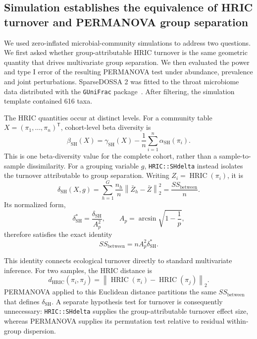 \subsection{Simulation establishes the equivalence of HRIC turnover and PERMANOVA group separation}

We used zero-inflated microbial-community simulations to address two questions.
We first asked whether group-attributable HRIC turnover is the same geometric
quantity that drives multivariate group separation. We then evaluated the
power and type I error of the resulting PERMANOVA test under abundance,
prevalence and joint perturbations. SparseDOSSA 2 was fitted to the throat
microbiome data distributed with the \texttt{GUniFrac}
package~\cite{charlson2010disordered,chen2012associating,
ma2021sparsedossa}. After filtering, the simulation template contained 616
taxa.

The HRIC quantities occur at distinct levels. For a community table
\(X=(\pi_1,\ldots,\pi_n)^\mathsf{T}\), cohort-level beta diversity is
\[
\beta_{\mathrm{SH}}(X)
  = \gamma_{\mathrm{SH}}(X)
  - \frac{1}{n}\sum_{i=1}^{n}\alpha_{\mathrm{SH}}(\pi_i).
\]
This is one beta-diversity value for the complete cohort, rather than a
sample-to-sample dissimilarity. For a grouping variable \(g\),
\texttt{HRIC::SHdelta} instead isolates the turnover attributable to group
separation. Writing \(Z_i=\operatorname{HRIC}(\pi_i)\), it is
\[
\delta_{\mathrm{SH}}(X,g)
  = \sum_{h=1}^{G}\frac{n_h}{n}
    \left\lVert\bar Z_h-\bar Z\right\rVert_2^2
  = \frac{SS_{\mathrm{between}}}{n}.
\]
Its normalized form,
\[
\delta_{\mathrm{SH}}^*
  = \frac{\delta_{\mathrm{SH}}}{A_p^2},
\qquad
A_p=\arcsin\sqrt{1-\frac{1}{p}},
\]
therefore satisfies the exact identity
\[
SS_{\mathrm{between}}
  = nA_p^2\delta_{\mathrm{SH}}^*.
\]

This identity connects ecological turnover directly to standard multivariate
inference. For two samples, the HRIC distance is
\[
d_{\mathrm{HRIC}}(\pi_i,\pi_j)
  = \left\lVert
      \operatorname{HRIC}(\pi_i)
      - \operatorname{HRIC}(\pi_j)
    \right\rVert_2 .
\]
PERMANOVA applied to this Euclidean distance partitions the same
\(SS_{\mathrm{between}}\) that defines \(\delta_{\mathrm{SH}}\). A separate
hypothesis test for turnover is consequently unnecessary:
\texttt{HRIC::SHdelta} supplies the group-attributable turnover effect size,
whereas PERMANOVA supplies its permutation test relative to residual
within-group dispersion.

